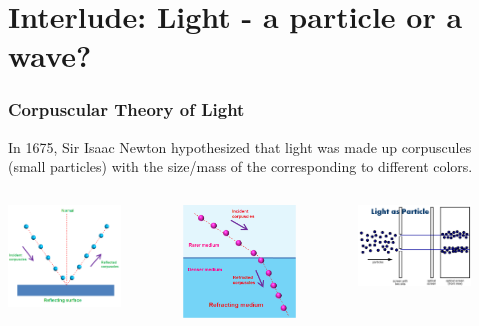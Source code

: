 \documentclass{beamer}
\begin{document}
\section{Interlude: Light - a particle or a wave?}

\begin{frame}\frametitle{Corpuscular Theory of Light}

In 1675, Sir Isaac Newton hypothesized that light was made up corpuscules (small particles) with the size/mass of the corresponding to different colors. 

\begin{columns}
\begin{column}{3.5cm}
\begin{center}
\includegraphics[width=3cm]{fig/corpReflect.png}
\end{center}
\end{column}

\begin{column}{3.5cm}
\begin{center}
\includegraphics[width=3cm]{fig/corpRefract.png}
\end{center}
\end{column}

\begin{column}{3.5cm}
\begin{center}
\includegraphics[width=3cm]{fig/corpDoubleSlit.png}
\end{center}
\end{column}
\end{columns}
\end{frame}
\end{document}
